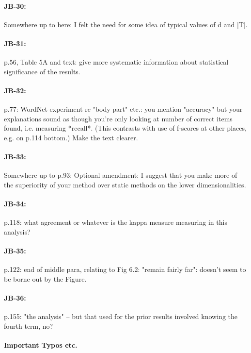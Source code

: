 \documentclass[11pt,a4paper]{article}
\begin{document}
\paragraph{JB-30:} Somewhere up to here: I felt the need for some idea of typical values of d and |T|.

\paragraph{JB-31:} p.56, Table 5A and text: give more systematic information about statistical significance of the results.

\paragraph{JB-32:} p.77: WordNet experiment re "body part" etc.: you mention "accuracy" but your explanations sound as though you're only looking at number of correct items found, i.e. measuring *recall*. (This contrasts with use of f-scores at other places, e.g. on p.114 bottom.) Make the text clearer.

\paragraph{JB-33:} Somewhere up to p.93: Optional amendment: I suggest that you make more of the superiority of your method over static methods on the lower dimensionalities.

\paragraph{JB-34:} p.118: what agreement or whatever is the kappa measure measuring in this analysis?

\paragraph{JB-35:} p.122: end of middle para, relating to Fig 6.2: "remain fairly far": doesn't seem to be borne out by the Figure.

\paragraph{JB-36:} p.155: "the analysis" -- but that used for the prior results involved knowing the fourth term, no?

\paragraph{Important Typos etc.}
\end{document}
